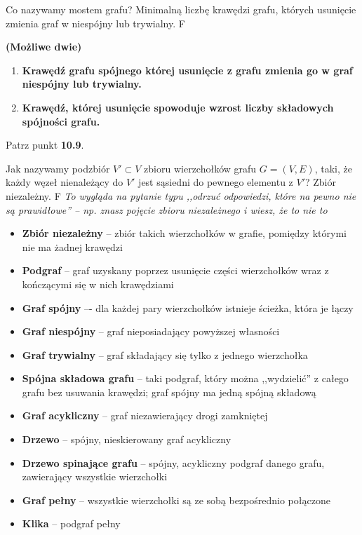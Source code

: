 \answer
{Co nazywamy mostem grafu?}
{Minimalną liczbę krawędzi grafu, których usunięcie zmienia graf w niespójny lub trywialny.}
{F}
{\textbf{(Możliwe dwie)} 
\begin{enumerate}[label=(\alph*)]
\item \textbf{Krawędź grafu spójnego której usunięcie z grafu zmienia go w graf niespójny lub trywialny.}
\item \textbf{Krawędź, której usunięcie spowoduje wzrost liczby składowych spójności grafu.}
\end{enumerate}
}
{Patrz punkt \textbf{10.9}.}




\answer
{Jak nazywamy podzbiór $V' \subset V$ zbioru wierzchołków grafu $G = (V, E)$, taki, że każdy węzeł nienależący do $V'$ jest sąsiedni do pewnego elementu z $V'$?}
{Zbiór niezależny.}
{F}
{\textit{To wygląda na pytanie typu ,,odrzuć odpowiedzi, które na pewno nie są prawidłowe'' -- np. znasz pojęcie zbioru niezależnego i wiesz, że to nie to}}
{ 
\begin{itemize}
\item \textbf{Zbiór niezależny} -- zbiór takich wierzchołków w grafie, pomiędzy którymi nie ma żadnej krawędzi
\item \textbf{Podgraf} -- graf uzyskany poprzez usunięcie części wierzchołków wraz z kończącymi się w nich krawędziami
\item \textbf{Graf spójny} –- dla każdej pary wierzchołków istnieje ścieżka, która je łączy
\item \textbf{Graf niespójny} -- graf nieposiadający powyższej własności
\item \textbf{Graf trywialny} -- graf składający się tylko z jednego wierzchołka
\item \textbf{Spójna składowa grafu} -- taki podgraf, który można ,,wydzielić'' z całego grafu bez usuwania krawędzi; graf spójny ma jedną spójną składową
\item \textbf{Graf acykliczny} -- graf niezawierający drogi zamkniętej
\item \textbf{Drzewo} -- spójny, nieskierowany graf acykliczny
\item \textbf{Drzewo spinające grafu} -- spójny, acykliczny podgraf danego grafu, zawierający wszystkie wierzchołki
\item \textbf{Graf pełny} -- wszystkie wierzchołki są ze sobą bezpośrednio połączone
\item \textbf{Klika} -- podgraf pełny
\end{itemize}
}




